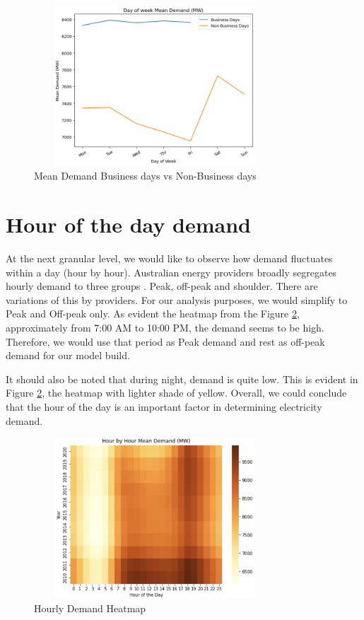 \documentclass[mstat,12pt]{unswthesis}
\begin{document}
\begin{figure}[H]
\centering
\includegraphics[width=0.80\textwidth,height=6cm]{day_demand.png}
\caption{Mean Demand Business days vs Non-Business days}
\label{day_demand}
\end{figure}

\section{Hour of the day demand}\label{hour-of-the-day-demand}

At the next granular level, we would like to observe how demand
fluctuates within a day (hour by hour). Australian energy providers
broadly segregates hourly demand to three groups
\cite{wrigley_2019_peak}. Peak, off-peak and shoulder. There are
variations of this by providers. For our analysis purposes, we would
simplify to Peak and Off-peak only. As evident the heatmap from the
Figure \ref{hour_heat}, approximately from 7:00 AM to 10:00 PM, the
demand seems to be high. Therefore, we would use that period as Peak
demand and rest as off-peak demand for our model build.

It should also be noted that during night, demand is quite low. This is
evident in Figure \ref{hour_heat}, the heatmap with lighter shade of
yellow. Overall, we could conclude that the hour of the day is an
important factor in determining electricity demand.

\begin{figure}[H]
\centering
\includegraphics[width=0.80\textwidth,height=6cm]{hour_heat.png}
\caption{Hourly Demand Heatmap}
\label{hour_heat}
\end{figure}
\end{document}
